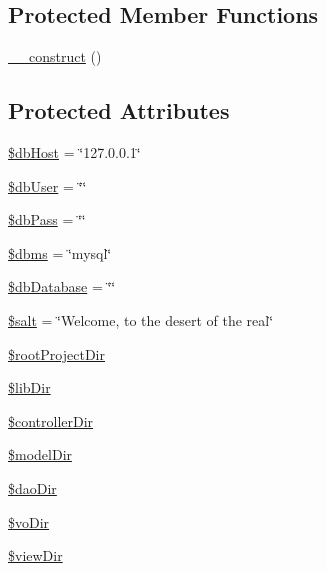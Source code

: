 \subsection*{Protected Member Functions}
\begin{DoxyCompactItemize}
\item 
\hyperlink{class_sec_plus_1_1_config_a095c5d389db211932136b53f25f39685}{\_\-\_\-construct} ()
\end{DoxyCompactItemize}
\subsection*{Protected Attributes}
\begin{DoxyCompactItemize}
\item 
\hyperlink{class_sec_plus_1_1_config_ad0ddb2725e69c88a729e0cc242a1b2a6}{\$dbHost} = \char`\"{}127.0.0.1\char`\"{}
\item 
\hyperlink{class_sec_plus_1_1_config_a4a92606de85aafdc0dcae4976b7ca669}{\$dbUser} = \char`\"{}\char`\"{}
\item 
\hyperlink{class_sec_plus_1_1_config_a30d808caf55f524798c6a5aaafd633ad}{\$dbPass} = \char`\"{}\char`\"{}
\item 
\hyperlink{class_sec_plus_1_1_config_afab8c86a322f139eb79e33a312ea64b5}{\$dbms} = \char`\"{}mysql\char`\"{}
\item 
\hyperlink{class_sec_plus_1_1_config_a00d9dc02081f2b17c0dae80bf86fea99}{\$dbDatabase} = \char`\"{}\char`\"{}
\item 
\hyperlink{class_sec_plus_1_1_config_adc4dc6ee2d56ad844a1ccd6be7cd5af5}{\$salt} = \char`\"{}Welcome, to the desert of the real\char`\"{}
\item 
\hyperlink{class_sec_plus_1_1_config_a95fa44cd6d4c68d1925ad70e41c0dd74}{\$rootProjectDir}
\item 
\hyperlink{class_sec_plus_1_1_config_a662682afa081c488ee7d6b2de6bd2f6c}{\$libDir}
\item 
\hyperlink{class_sec_plus_1_1_config_a3c641dd8bef8033ed0ff088f937e136c}{\$controllerDir}
\item 
\hyperlink{class_sec_plus_1_1_config_a0a45e14f2c297b0c0e8f956085385548}{\$modelDir}
\item 
\hyperlink{class_sec_plus_1_1_config_a5430f8a675b729372fc0109059692046}{\$daoDir}
\item 
\hyperlink{class_sec_plus_1_1_config_a0e8d14506ce531421f71a921636e349f}{\$voDir}
\item 
\hyperlink{class_sec_plus_1_1_config_a004b9a4e7f26647a02a1a2ec1eb4551a}{\$viewDir}

\end{DoxyCompactItemize}
